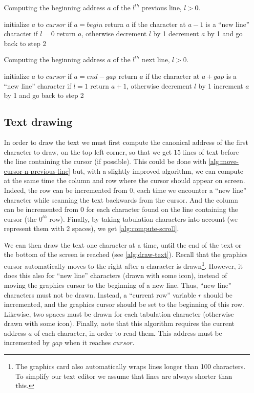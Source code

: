 \begin{Algorithm}
\caption{Computing the beginning address $a$ of the $l^{th}$ previous line,
$l>0$.}\label{alg:move-cursor-n-previous-line}
\begin{algorithmic}[1]
\State initialize $a$ to $cursor$
\State if $a = begin$ return $a$
\Begin if the character at $a-1$ is a ``new line'' character
  \State if $l=0$ return $a$, otherwise decrement $l$ by 1
\End
\State decrement $a$ by 1 and go back to step 2
\end{algorithmic}
\end{Algorithm}

\begin{Algorithm}
\caption{Computing the beginning address $a$ of the $l^{th}$ next line,
$l>0$.}\label{alg:move-cursor-n-next-line}
\begin{algorithmic}[1]
\State initialize $a$ to $cursor$
\State if $a = end-gap$ return $a$
\Begin if the character at $a+gap$ is a ``new line'' character
  \State if $l=1$ return $a+1$, otherwise decrement $l$ by 1
\End
\State increment $a$ by 1 and go back to step 2
\end{algorithmic}
\end{Algorithm}

\subsection{Text drawing}

In order to draw the text we must first compute the canonical address of the
first character to draw, on the top left corner, so that we get 15 lines of
text before the line containing the cursor (if possible). This could be done
with \cref{alg:move-cursor-n-previous-line} but, with a slightly improved
algorithm, we can compute at the same time the column and row where the cursor
should appear on screen. Indeed, the row can be incremented from 0, each time
we encounter a ``new line'' character while scanning the text backwards from
the cursor. And the column can be incremented from 0 for each character found
on the line containing the cursor (the $0^{th}$ row). Finally, by taking
tabulation characters into account (we represent them with 2 spaces), we get
\cref{alg:compute-scroll}.

We can then draw the text one character at a time, until the end of the text or
the bottom of the screen is reached (see \cref{alg:draw-text}). Recall that the
graphics cursor automatically moves to the right after a character is
drawn\footnote{The graphics card also automatically wraps lines longer than 100
characters. To simplify our text editor we assume that lines are always shorter
than this.}. However, it does this also for ``new line'' characters (drawn with
some icon), instead of moving the graphics cursor to the beginning of a new
line. Thus, ``new line'' characters must not be drawn. Instead, a ``current
row'' variable $r$ should be incremented, and the graphics cursor should be set
to the beginning of this row. Likewise, two spaces must be drawn for each
tabulation character (otherwise drawn with some icon). Finally, note that this
algorithm requires the current address $a$ of each character, in order to read
them. This address must be incremented by $gap$ when it reaches $cursor$.

